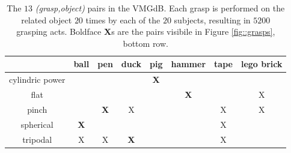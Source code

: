 \documentclass{article}
\newcommand{\db}{\textsf{VMGdB}}
\begin{document}
\begin{table} \centering
 \label{tab:manytomany}
 \caption{The $13$ {\em (grasp,object)} pairs in the \db. Each grasp is performed
          on the related object $20$ times by each of the $20$ subjects,
          resulting in $5200$ grasping acts. Boldface {\bf X}s are the pairs
          visibile in Figure \ref{fig::grasps}, bottom row.}
 \begin{tabular}{c||c|c|c|c|c|c|c} \hline
                   & ball    &     pen &  duck   &     pig &  hammer & tape & lego brick \\ \hline\hline 
   cylindric power &         &         &         & {\bf X} &         &      &            \\ \hline
              flat &         &         &         &         & {\bf X} &      &     X      \\ \hline
             pinch &         & {\bf X} &    X    &         &         &   X  &     X      \\ \hline
         spherical & {\bf X} &         &         &         &         &   X  &            \\ \hline
          tripodal &    X    &       X & {\bf X} &         &         &   X  &            \\
 \end{tabular}
\end{table}
\end{document}
